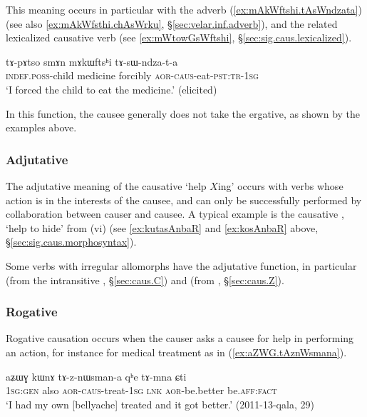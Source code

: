 This meaning occurs in particular with the adverb  (\ref{ex:mAkWftshi.tAsWndzata}) (see also \ref{ex:mAkWfsthi.chAsWrku}, §\ref{sec:velar.inf.adverb}), and the related lexicalized causative verb  (see \ref{ex:mWtowGsWftshi}, §\ref{sec:sig.caus.lexicalized}).

\begin{exe}
\ex \label{ex:mAkWftshi.tAsWndzata}
\gll  tɤ-pɤtso smɤn mɤkɯftsʰi tɤ-sɯ-ndza-t-a \\
\textsc{indef}.\textsc{poss}-child medicine forcibly \textsc{aor}-\textsc{caus}-eat-\textsc{pst}:\textsc{tr}-\textsc{1sg} \\
\glt `I forced the child to eat the medicine.' (elicited)
\end{exe}

In this function, the causee generally does not take the ergative, as shown by the examples above.


\subsubsection{Adjutative} \label{sec:sig.caus.adjutative}
The adjutative meaning of the causative `help $X$ing' occurs with verbs whose action is in the interests of the causee, and can only be successfully performed by collaboration between causer and causee. A typical example is the causative , `help to hide' from  (vi) (see \ref{ex:kutasAnbaR} and \ref{ex:kosAnbaR} above, §\ref{sec:sig.caus.morphosyntax}).

Some verbs with irregular allomorphs have the adjutative function, in  particular  (from the intransitive , §\ref{sec:caus.C}) and   (from , §\ref{sec:caus.Z}).

\subsubsection{Rogative} \label{sec:sig.caus.rogative}
Rogative causation occurs when the causer asks a causee for help in performing an action, for instance for medical treatment as in (\ref{ex:aZWG.tAznWsmana}). 

\begin{exe}
\ex \label{ex:aZWG.tAznWsmana}
\gll aʑɯɣ kɯnɤ tɤ-z-nɯsman-a qʰe tɤ-mna ɕti \\
\textsc{1sg}:\textsc{gen} also \textsc{aor}-\textsc{caus}-treat-\textsc{1sg} \textsc{lnk} \textsc{aor}-be.better be.\textsc{aff}:\textsc{fact} \\
\glt `I had my own [bellyache] treated and it got better.' (2011-13-qala, 29)
\end{exe}

